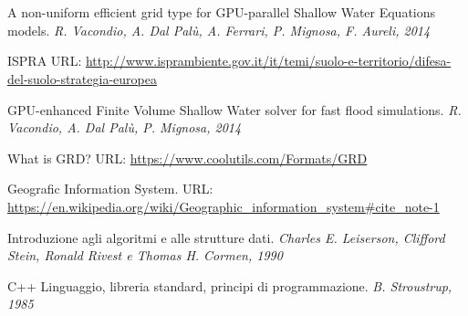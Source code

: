 \chapter*{}
  \begin{thebibliography}{}

  	 A non-uniform efficient grid type for GPU-parallel Shallow Water Equations models. \emph{R. Vacondio, A. Dal Pal\`{u}, A. Ferrari, P. Mignosa, F. Aureli, 2014}

  	 ISPRA URL: \url{http://www.isprambiente.gov.it/it/temi/suolo-e-territorio/difesa-del-suolo-strategia-europea}

  	 GPU-enhanced Finite Volume Shallow Water solver for fast flood simulations. \emph{R. Vacondio, A. Dal Pal\`{u}, P. Mignosa, 2014}

  	 What is GRD? URL: \url{https://www.coolutils.com/Formats/GRD}

     Geografic Information System. URL: \url{https://en.wikipedia.org/wiki/Geographic\_information\_system\#cite\_note-1}

    \bibitem{} Introduzione agli algoritmi e alle strutture dati. \emph{Charles E. Leiserson, Clifford Stein, Ronald Rivest e Thomas H. Cormen, 1990}

    \bibitem{} C++ Linguaggio, libreria standard, principi di programmazione. \emph{B. Stroustrup, 1985}

  \end{thebibliography}